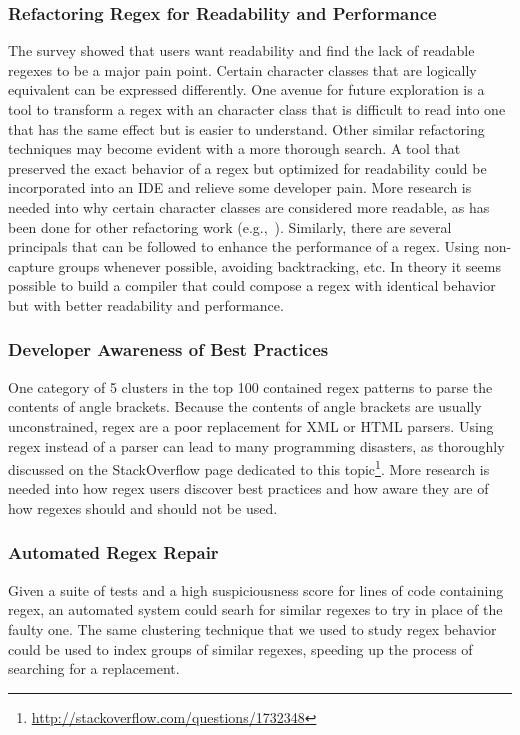 \subsubsection{Refactoring Regex for Readability and Performance}
The survey showed that users want readability and find the lack of readable regexes to be a major pain point.  Certain character classes that are logically equivalent can be expressed differently.  One avenue for future exploration is a tool to transform a regex with an character class that is difficult to read into one that has the same effect but is easier to understand.
Other similar refactoring techniques may become evident with a more thorough search.  A tool that preserved the exact behavior of a regex but optimized for readability could be incorporated into an IDE and relieve some developer pain.  More research is needed into why certain character classes are considered more readable, as has been done for other refactoring work (e.g.,~\cite{StoleeTSE2013}).
Similarly, there are several principals that can be followed to enhance the performance of a regex.  Using non-capture groups whenever possible, avoiding backtracking, etc.  In theory it seems possible to build a compiler that could compose a regex with identical behavior but with better readability and performance.

\subsubsection{Developer Awareness of Best Practices}
One category of 5 clusters in the top 100 contained regex patterns to parse the contents of angle brackets.  Because the contents of angle brackets are usually unconstrained, regex are a poor replacement for XML or HTML parsers.  Using regex instead of a parser can lead to many programming disasters, as thoroughly discussed on the StackOverflow page dedicated to this topic\footnote{\url{http://stackoverflow.com/questions/1732348}}.  More research is needed into how regex users discover best practices and how aware they are of how regexes should and should not be used.

\subsubsection{Automated Regex Repair}
Given a suite of tests and a high suspiciousness score for lines of code containing regex, an automated system could searh for similar regexes to try in place of the faulty one.  The same clustering technique that we used to study regex behavior could be used to index groups of similar regexes, speeding up the process of searching for a replacement.




